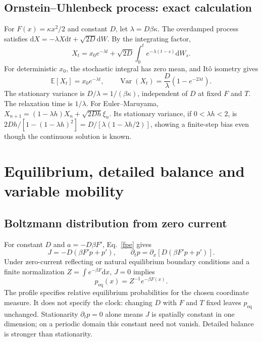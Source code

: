\documentclass[11pt,a4paper]{article}
\newcommand{\dd}{\mathrm d}
\newcommand{\E}{\mathbb E}
\newcommand{\peq}{p_{\mathrm{eq}}}
\theoremstyle{remark}\newtheorem*{remark}{Physical interpretation}
\begin{document}
\subsection{Ornstein--Uhlenbeck process: exact calculation}
For $F(x)=\kappa x^2/2$ and constant $D$, let $\lambda=D\beta\kappa$. The overdamped process satisfies $\dd X=-\lambda X\dd t+\sqrt{2D}\dd W$. By the integrating factor,
\begin{equation}X_t=x_0e^{-\lambda t}+\sqrt{2D}\int_0^t e^{-\lambda(t-s)}\dd W_s.\end{equation}
For deterministic $x_0$, the stochastic integral has zero mean, and It\^o isometry gives
\begin{equation}\E[X_t]=x_0e^{-\lambda t},\qquad \operatorname{Var}(X_t)=\frac{D}{\lambda}(1-e^{-2\lambda t}).\end{equation}
The stationary variance is $D/\lambda=1/(\beta\kappa)$, independent of $D$ at fixed $F$ and $T$. The relaxation time is $1/\lambda$. For Euler--Maruyama, $X_{n+1}=(1-\lambda h)X_n+\sqrt{2Dh}\xi_n$. Its stationary variance, if $0<\lambda h<2$, is $2Dh/[1-(1-\lambda h)^2]=D/[\lambda(1-\lambda h/2)]$, showing a finite-step bias even though the continuous solution is known.

\section{Equilibrium, detailed balance and variable mobility}
\subsection{Boltzmann distribution from zero current}
For constant $D$ and $a=-D\beta F'$, Eq.~\eqref{fpe} gives
\begin{equation}J=-D(\beta F'p+p'),\qquad\partial_t p=\partial_x[D(\beta F'p+p')].\end{equation}
Under zero-current reflecting or natural equilibrium boundary conditions and a finite normalization $Z=\int e^{-\beta F}\dd x$, $J=0$ implies
\begin{equation}\peq(x)=Z^{-1}e^{-\beta F(x)}.\end{equation}
The profile specifies relative equilibrium probabilities for the chosen coordinate measure. It does not specify the clock: changing $D$ with $F$ and $T$ fixed leaves $\peq$ unchanged. Stationarity $\partial_t p=0$ alone means $J$ is spatially constant in one dimension; on a periodic domain this constant need not vanish. Detailed balance is stronger than stationarity.
\end{document}
